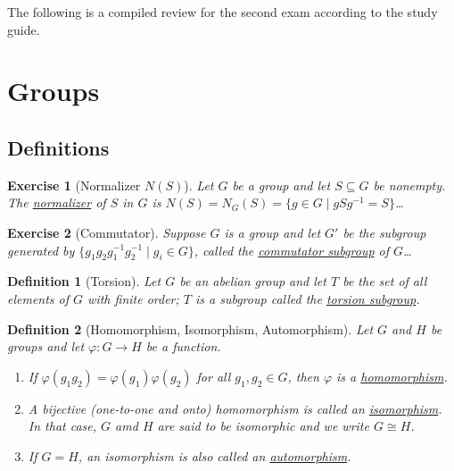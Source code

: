 \documentclass[12pt]{article}
\newtheorem{defn}{Definition}
\newtheorem{exer}{Exercise}
\numberwithin{problem}{section} %
\numberwithin{defn}{section} %
\numberwithin{thm}{section} %
\numberwithin{exer}{section} %
\theoremstyle{remark}  %
\begin{document}
 
%
\rhead{\today}

The following is a compiled review for the second exam according to the study guide.

\renewcommand{\thesubsection}{\Alph{subsection}}

\setcounter{section}{1}  %
\section{Groups}
\setcounter{subsection}{0}  %
\subsection{Definitions}

\setcounter{exer}{71}
\begin{exer}[Normalizer $N(S)$]
    Let $G$ be a group and let $S\subseteq G$ be nonempty. The \ul{normalizer} of $S$ in $G$ is $N(S)=N_G(S)=\{g\in G \mid gSg^{-1}=S\}$\dots
\end{exer}

\begin{exer}[Commutator]
    Suppose $G$ is a group and let $G'$ be the subgroup generated by $\{g_1g_2g_1^{-1}g_2^{-1} \mid g_i \in G\}$, called the \ul{commutator subgroup} of $G$\dots
\end{exer}

\begin{defn}[Torsion]
    Let $G$ be an abelian group and let $T$ be the set of all elements of $G$ with finite order; $T$ is a subgroup called the \ul{torsion subgroup}. 
\end{defn}

\setcounter{defn}{19}
\begin{defn}[Homomorphism, Isomorphism, Automorphism]
    Let $G$ and $H$ be groups and let $\varphi\operatorname{:}G \to H$ be a function.
    \begin{enumerate}
        \item If $\varphi(g_1g_2)=\varphi(g_1)\varphi(g_2)$ for all $g_1,g_2\in G$, then $\varphi$ is a \ul{homomorphism}.
        \item A bijective (one-to-one and onto) homomorphism is called an \ul{isomorphism}. In that case, $G$ amd $H$ are said to be isomorphic and we write $G \cong H$.
        \item If $G=H$, an isomorphism is also called an \ul{automorphism}.
    \end{enumerate}
\end{defn}
\end{document}
